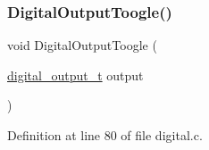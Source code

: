 \subsubsection{\texorpdfstring{Digital\+Output\+Toogle()}{DigitalOutputToogle()}}
{\footnotesize\ttfamily void Digital\+Output\+Toogle (\begin{DoxyParamCaption}\item[{\hyperlink{group___plantilla_ga3e63b19d3d0dbfbfb2c50b3ac1f69aa0}{digital\+\_\+output\+\_\+t}}]{output }\end{DoxyParamCaption})}



Definition at line 80 of file digital.\+c.

